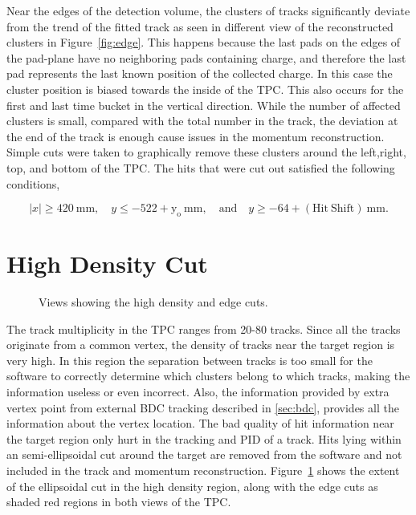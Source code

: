 Near the edges of the detection volume, the clusters of tracks significantly deviate from the trend of the fitted track as seen in different view of the reconstructed clusters in Figure~\ref{fig:edge}.  This happens because the last pads on the edges of the pad-plane have no neighboring pads containing charge, and therefore the last pad represents the last known position of the collected charge. In this case the cluster position is biased towards the inside of the TPC. This also occurs for the first and last time bucket in the vertical direction. While the number of affected clusters is small, compared with the total number in the track, the deviation at the end of the track is enough cause issues in the momentum reconstruction. Simple cuts were taken to graphically remove these clusters around the left,right, top, and bottom of the TPC. The hits that were cut out satisfied the following conditions, 

\begin{equation*}
  |x|\geq420~\mathrm{mm},\quad y\leq-522+\mathrm{y_o}~\mathrm{mm},
  \quad\mathrm{and}\quad y\geq-64+\mathrm{(Hit\ Shift)}~\mathrm{mm}.
\label{eq:hitshift}
\end{equation*}



\section{High Density Cut}



\begin{figure}[!htb]%
    \centering
    \qquad
 	  \label{fig:highcut}
        \caption{Views showing the high density and edge cuts.}
        \label{fig:elipsecut}
\end{figure}



The track multiplicity in the TPC ranges from 20-80 tracks. Since all the tracks originate from a common vertex, the density of tracks near the target region is very high. In this region the separation between tracks is too small for the software to correctly determine which clusters belong to which tracks, making the information useless or even incorrect. Also, the information provided by extra vertex point from external BDC tracking described in \ref{sec:bdc}, provides all the information about the vertex location. The bad quality of hit information near the target region only hurt in the tracking and PID of a track. Hits lying within an semi-ellipsoidal cut around the target are removed from the software and not included in the track and momentum reconstruction. Figure~\ref{fig:elipsecut} shows the extent of the ellipsoidal cut in the high density region, along with the edge cuts as shaded red regions in both views of the TPC. 

